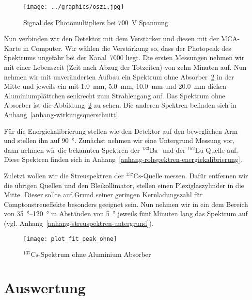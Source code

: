 \documentclass[11pt, ngerman, fleqn, DIV=15, headinclude, BCOR=2cm]{scrreprt}
\newcommand{\plotwidth}{0.8\linewidth}
\begin{document}
\begin{figure}
	\centering
	\texttt{[image: ../graphics/oszi.jpg]}
	\caption{%
		Signal des Photomultipliers bei \SI{700}{\volt} Spannung
	}
	\label{fig:oszi}
\end{figure}

Nun verbinden wir den Detektor mit dem Verstärker und diesen mit der MCA-Karte
in Computer. Wir wählen die Verstärkung so, dass der Photopeak des Spektrums
ungefähr bei der Kanal~7000 liegt. Die ersten Messungen nehmen wir mit
einer Lebenszeit (Zeit nach Abzug der Totzeiten) von zehn Minuten auf.
Nun nehmen wir mit unveränderten Aufbau ein Spektrum ohne Absorber~\ref{fig:plot_fit_peak_ohne} in der Mitte
und jeweils ein mit \SI{1,0}{\milli\meter}, \SI{5,0}{\milli\meter},
\SI{10,0}{\milli\meter} und \SI{20,0}{\milli\meter} dicken Aluminiumplättchen
senkrecht zum Strahlengang auf. Das Spektrum ohne Absorber ist die
Abbildung~\ref{fig:plot_fit_peak_ohne} zu sehen. Die anderen Spektren befinden
sich in Anhang~\ref{anhang-wirkungsquerschnitt}.

Für die Energiekalibrierung stellen wie den Detektor auf den beweglichen Arm
und stellen ihn auf \SI{90}{\degree}. Zunächst nehmen wir eine Untergrund
Messung vor, dann nehmen wir die bekannten Spektren der $^{133}\text{Ba}$- und
der $^{152}\text{Eu}$-Quelle auf. Diese Spektren finden sich in
Anhang~\ref{anhang-rohspektren-energiekalibrierung}.

Zuletzt wollen wir die Streuspektren der $^{137}\text{Cs}$-Quelle messen. Dafür
entfernen wir die übrigen Quellen und den Bleikollimator, stellen einen Plexiglaszylinder 
in die Mitte. Dieser
sollte auf Grund seiner geringen Kernladungszahl für Comptonstreueffekte besonders
geeignet sein. Nun nehmen wir in ein dem Bereich von \SIrange{35}{120}{\degree}
in Abständen von \SI{5}{\degree} jeweils fünf Minuten lang das Spektrum auf
(vgl. Anhang~\ref{anhang-streuspektren-untergrund}).

\begin{figure}[h]
    \centering
    \texttt{[image: plot\_fit\_peak\_ohne]}
    \caption{%
	    $^{137}\text{Cs}$-Spektrum ohne Aluminium Absorber
   }
    \label{fig:plot_fit_peak_ohne}
\end{figure}



\chapter{Auswertung}
\end{document}
